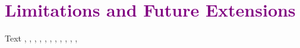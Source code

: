 \section{\textcolor{purple}{Limitations and Future Extensions}}

\color{purple}

Text
\cite{edelsbrunner1994}, \cite{coeurjolly2021}, \cite{fleishman2005}, \cite{brochu2010}, \cite{berge2019}, \cite{dey2003}, \cite{amenta2000}, \cite{dey2011}, \cite{boltcheva2017}, \cite{boltcheva2009}, \cite{kazhdan_2008}, \cite{kazhdan_2013}

\cite{levin2004}







\color{black}